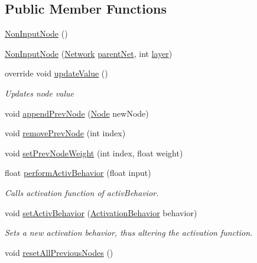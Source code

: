 \subsection*{Public Member Functions}
\begin{DoxyCompactItemize}
\item 
\mbox{\hyperlink{class_non_input_node_a3facbd688b6a772cf1259420238255c8}{Non\+Input\+Node}} ()
\item 
\mbox{\hyperlink{class_non_input_node_a2805394951d04ebab266877c5723132b}{Non\+Input\+Node}} (\mbox{\hyperlink{class_network}{Network}} \mbox{\hyperlink{class_non_input_node_ac79615aee9a2b85aa9c31f98451da37a}{parent\+Net}}, int \mbox{\hyperlink{class_non_input_node_a5614e202d11fbe3ca55ec88e6e803cb8}{layer}})
\item 
override void \mbox{\hyperlink{class_non_input_node_a075d0278c5500f0d2455a3d8eeb04f55}{update\+Value}} ()
\begin{DoxyCompactList}\small\item\em Updates node value \end{DoxyCompactList}\item 
void \mbox{\hyperlink{class_non_input_node_a458bad6de5c7d5e82d85998d456be3ec}{append\+Prev\+Node}} (\mbox{\hyperlink{class_node}{Node}} new\+Node)
\item 
void \mbox{\hyperlink{class_non_input_node_a2318ad48afb979bc655d67b4f7f6dca2}{remove\+Prev\+Node}} (int index)
\item 
void \mbox{\hyperlink{class_non_input_node_a7c1d1f3d6b86394ade501797f1733472}{set\+Prev\+Node\+Weight}} (int index, float weight)
\item 
float \mbox{\hyperlink{class_non_input_node_ab6f9a79605853e0e4aec8c7034345aa0}{perform\+Activ\+Behavior}} (float input)
\begin{DoxyCompactList}\small\item\em Calls activation function of activ\+Behavior. \end{DoxyCompactList}\item 
void \mbox{\hyperlink{class_non_input_node_a44be3d4caebaa9f9fc8d6c9659bdb674}{set\+Activ\+Behavior}} (\mbox{\hyperlink{interface_activation_behavior}{Activation\+Behavior}} behavior)
\begin{DoxyCompactList}\small\item\em Sets a new activation behavior, thus altering the activation function. \end{DoxyCompactList}\item 
void \mbox{\hyperlink{class_non_input_node_a703986aac246746c6269522d7a03e13e}{reset\+All\+Previous\+Nodes}} ()

\end{DoxyCompactItemize}
